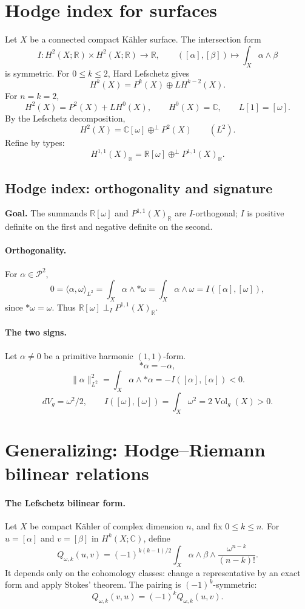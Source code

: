 \documentclass[11pt]{article}
\newcommand{\C}{\mathbb C}
\newcommand{\R}{\mathbb R}
\newcommand{\Prim}{\mathcal P}
\newcommand{\orthsum}{\mathbin{\oplus^{\perp}}}
\newcommand{\Vol}{\operatorname{Vol}}
\begin{document}
\section*{Hodge index for surfaces}
Let $X$ be a connected compact K\"ahler surface.
The intersection form
\[
 I:H^2(X;\R)\times H^2(X;\R)\longrightarrow\R,
 \qquad([\alpha],[\beta])\longmapsto\int_X\alpha\wedge\beta
\]
is symmetric. For $0\leq k\leq2$, Hard Lefschetz gives
\[
 H^k(X)=P^k(X)\oplus LH^{k-2}(X).
\]
For $n=k=2$,
\[
 H^2(X)=P^2(X)+LH^0(X),\qquad H^0(X)=\C,\qquad L[1]=[\omega].
\]
By the Lefschetz decomposition,
\[
 H^2(X)=\C[\omega]\orthsum P^2(X)\qquad(L^2).
\]
Refine by types:
\[
 H^{1,1}(X)_{\R}=\R[\omega]\orthsum P^{1,1}(X)_{\R}.
\]

\subsection*{Hodge index: orthogonality and signature}
\textbf{Goal.} The summands $\R[\omega]$ and $P^{1,1}(X)_{\R}$ are
$I$-orthogonal; $I$ is positive definite on the first and negative
definite on the second.

\paragraph{Orthogonality.}
For $\alpha\in\Prim^2$,
\[
 0=\langle\alpha,\omega\rangle_{L^2}
 =\int_X\alpha\wedge *\omega
 =\int_X\alpha\wedge\omega
 =I([\alpha],[\omega]),
\]
since $*\omega=\omega$. Thus
$\R[\omega]\perp_I P^{1,1}(X)_{\R}$.

\paragraph{The two signs.}
Let $\alpha\neq0$ be a primitive harmonic $(1,1)$-form.
\[
 *\alpha=-\alpha,
\]
\[
 \|\alpha\|_{L^2}^2=\int_X\alpha\wedge *\alpha
 =-I([\alpha],[\alpha])<0.
\]
\[
 dV_g=\omega^2/2,\qquad
 I([\omega],[\omega])=\int_X\omega^2=2\Vol_g(X)>0.
\]

\section*{Generalizing: Hodge--Riemann bilinear relations}
\paragraph{The Lefschetz bilinear form.}
Let $X$ be compact K\"ahler of complex dimension $n$, and fix
$0\leq k\leq n$. For $u=[\alpha]$ and $v=[\beta]$ in $H^k(X;\C)$,
define
\[
 Q_{\omega,k}(u,v)=(-1)^{k(k-1)/2}
 \int_X\alpha\wedge\beta\wedge\frac{\omega^{n-k}}{(n-k)!}.
\]
It depends only on the cohomology classes: change a representative by
an exact form and apply Stokes' theorem.
The pairing is $(-1)^k$-symmetric:
\[
 Q_{\omega,k}(v,u)=(-1)^kQ_{\omega,k}(u,v).
\]
\end{document}
